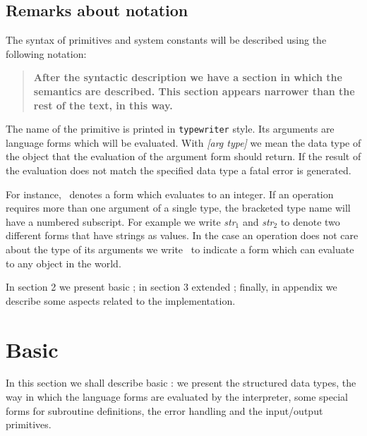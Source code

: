 \subsection{Remarks about notation}

The syntax of primitives and system constants will be described using the
following notation:

\begin{description}
	\item {}
	\item {}
	\item {}
	\item {}
\end{description}

\begin{quote}\bf
	After the syntactic description we have a section in which the semantics are
	described.
	This section appears narrower than the rest of the text, in this way.
\end{quote}

The name of the primitive is printed in {\tt typewriter} style.
Its arguments are language forms which will be evaluated.
With {\it [arg type]} we mean the data type of the {\HG} object that the
evaluation of the argument form should return.
If the result of the evaluation does not match the specified data type a fatal
error is generated.

For instance, \inte\ denotes a form which evaluates to an integer.
If an operation requires more than one argument of a single type, the bracketed
type name will have a numbered subscript.
For example we write {\it str\/$_1$} and {\it str\/$_2$} to denote two different
forms that have strings as values.
In the case an operation does not care about the type of its arguments we write
\obj\ to indicate a form which can evaluate to any object in the {\HG} world.

In section 2 we present basic {\HG}; in section 3 extended {\HG}; finally, in
appendix we describe some aspects related to the implementation.


\newpage
\section{Basic {\HG}}

In this section we shall describe basic {\HG}: we present the structured data
types, the way in which the language forms are evaluated by the interpreter,
some special forms for subroutine definitions, the error handling and the
input/output primitives.


